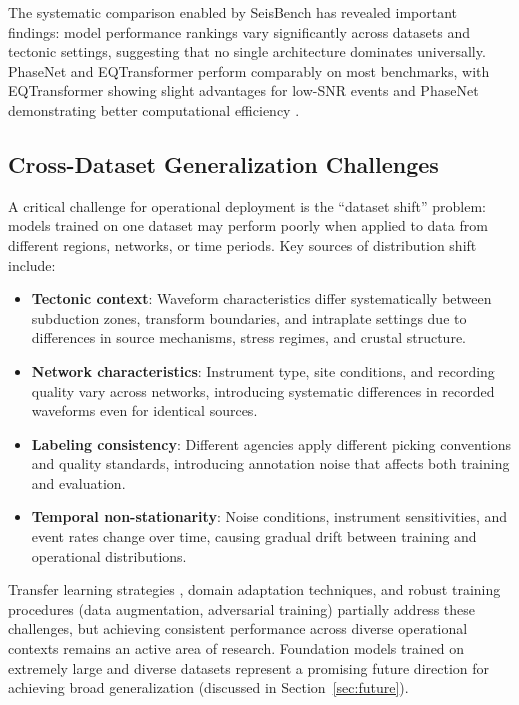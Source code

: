 \documentclass[review,authoryear]{elsarticle}
\begin{document}
The systematic comparison enabled by SeisBench has revealed important findings: model performance rankings vary significantly across datasets and tectonic settings, suggesting that no single architecture dominates universally. PhaseNet and EQTransformer perform comparably on most benchmarks, with EQTransformer showing slight advantages for low-SNR events and PhaseNet demonstrating better computational efficiency \citep{munchmeyer2022picker}.

\subsection{Cross-Dataset Generalization Challenges}

A critical challenge for operational deployment is the ``dataset shift'' problem: models trained on one dataset may perform poorly when applied to data from different regions, networks, or time periods. Key sources of distribution shift include:

\begin{itemize}
\item \textbf{Tectonic context}: Waveform characteristics differ systematically between subduction zones, transform boundaries, and intraplate settings due to differences in source mechanisms, stress regimes, and crustal structure.
\item \textbf{Network characteristics}: Instrument type, site conditions, and recording quality vary across networks, introducing systematic differences in recorded waveforms even for identical sources.
\item \textbf{Labeling consistency}: Different agencies apply different picking conventions and quality standards, introducing annotation noise that affects both training and evaluation.
\item \textbf{Temporal non-stationarity}: Noise conditions, instrument sensitivities, and event rates change over time, causing gradual drift between training and operational distributions.
\end{itemize}

Transfer learning strategies \citep{lapins2021deep}, domain adaptation techniques, and robust training procedures (data augmentation, adversarial training) partially address these challenges, but achieving consistent performance across diverse operational contexts remains an active area of research. Foundation models trained on extremely large and diverse datasets represent a promising future direction for achieving broad generalization (discussed in Section~\ref{sec:future}).
\end{document}
